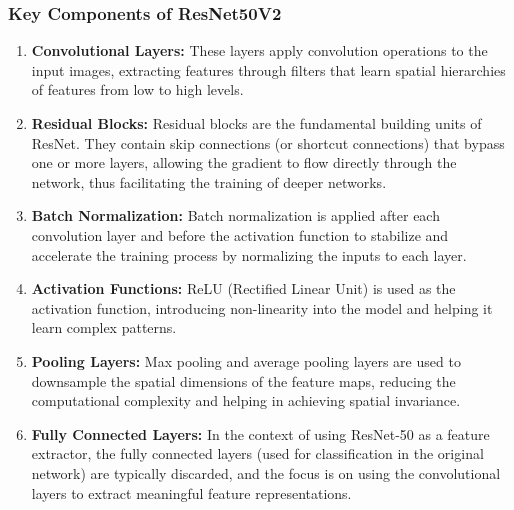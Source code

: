 \subsubsection{Key Components of ResNet50V2 }
\begin{enumerate}
    \item \textbf{Convolutional Layers: }These layers apply convolution operations to the input images, extracting features through filters that learn spatial hierarchies of features from low to high levels.
    \item \textbf{Residual Blocks: }Residual blocks are the fundamental building units of ResNet. They contain skip connections (or shortcut connections) that bypass one or more layers, allowing the gradient to flow directly through the network, thus facilitating the training of deeper networks.
    \item \textbf{Batch Normalization: }Batch normalization is applied after each convolution layer and before the activation function to stabilize and accelerate the training process by normalizing the inputs to each layer.
    \item \textbf{Activation Functions: }ReLU (Rectified Linear Unit) is used as the activation function, introducing non-linearity into the model and helping it learn complex patterns.
    \item \textbf{Pooling Layers: }Max pooling and average pooling layers are used to downsample the spatial dimensions of the feature maps, reducing the computational complexity and helping in achieving spatial invariance.
    \item \textbf{Fully Connected Layers: }In the context of using ResNet-50 as a feature extractor, the fully connected layers (used for classification in the original network) are typically discarded, and the focus is on using the convolutional layers to extract meaningful feature representations.
    
\end{enumerate}




